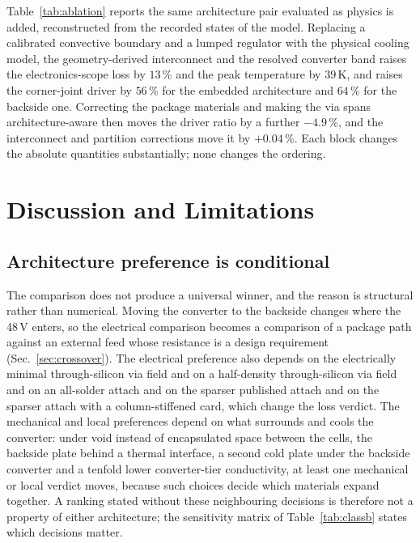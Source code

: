\documentclass[journal]{IEEEtran}
\begin{document}
Table~\ref{tab:ablation} reports the same architecture pair evaluated as physics is added,
reconstructed from the recorded states of the model. Replacing a calibrated convective
boundary and a lumped regulator with the physical cooling model, the geometry-derived
interconnect and the resolved converter band raises the electronics-scope loss by $13$\,\%
and the peak temperature by $39$\,K, and raises the corner-joint driver by $56$\,\% for the
embedded architecture and $64$\,\% for the backside one. Correcting the package materials and
making the via spans architecture-aware then moves the driver ratio by a further
$-4.9$\,\%, and the interconnect and partition corrections move it by $+0.04$\,\%. Each block
changes the absolute quantities substantially; none changes the ordering.
\section{Discussion and Limitations}\label{sec:discuss}
\subsection{Architecture preference is conditional}\label{sec:conditional}
The comparison does not produce a universal winner, and the reason is structural rather than
numerical. Moving the converter to the backside changes where the 48\,V enters, so the
electrical comparison becomes a comparison of a package path against an external feed whose
resistance is a design requirement (Sec.~\ref{sec:crossover}). The electrical preference also depends on the electrically minimal through-silicon via field and on a half-density through-silicon via field and on an all-solder attach and on the sparser published attach and on the sparser attach with a column-stiffened card, which change the loss verdict. The mechanical and local preferences depend on what surrounds and cools the converter: under void instead of encapsulated space between the cells, the backside plate behind a thermal interface, a second cold plate under the backside converter and a tenfold lower converter-tier conductivity, at least one mechanical or local verdict moves, because such choices decide which materials expand together. A ranking stated without these neighbouring decisions is therefore not a property of either architecture; the sensitivity matrix of Table~\ref{tab:classb} states which decisions matter.
\end{document}

